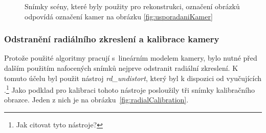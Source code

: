 \documentclass[11pt,oneside,a4paper,pdftex]{article}   %
\begin{document}
\begin{figure}[htbp]
{				\fbox{\begin{minipage}{3cm}\hfill\vspace{4cm}\end{minipage}}
			}
		\caption{Snímky scény, které byly použity pro rekonstrukci, označení obrázků
			odpovídá označení kamer na obrázku \ref{fig:usporadaniKamer}}
		\label{fig:fotografie}
	\end{figure}

\subsubsection{Odstranění radiálního zkreslení a kalibrace kamery} Protože použité algoritmy pra\-cují
s~lineárním modelem kamery, bylo nutné před dalším použitím nafocených snímků nej\-prve odstranit
radiální zkreslení. K tomuto účelu byl použit nástroj \emph{rd\_undistort}, který byl k dispozici od
vyučujících \cite{code_repo}.\footnote{Jak citovat tyto nástroje?} Jako podklad pro kalibraci tohoto
nástroje posloužily tři snímky kalibračního obrazce. Jeden z nich je na obrázku~\ref{fig:radialCalibration}.

\def\IAC{\boldsymbol \omega}
\end{document}
